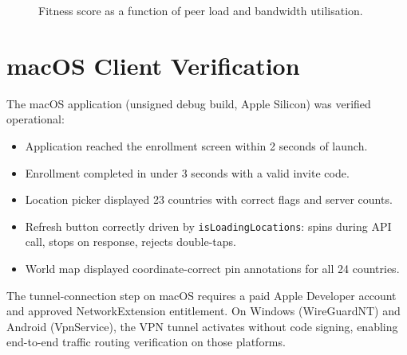 \documentclass[12pt,a4paper]{report}
\begin{document}
\begin{figure}[H]
\centering
{}
\caption{Fitness score as a function of peer load and bandwidth utilisation.}
\label{fig:fitness}
\end{figure}

\section{macOS Client Verification}

The macOS application (unsigned debug build, Apple Silicon) was verified operational:
\begin{itemize}[leftmargin=*, topsep=2pt, itemsep=0pt]
  \item Application reached the enrollment screen within 2 seconds of launch.
  \item Enrollment completed in under 3 seconds with a valid invite code.
  \item Location picker displayed 23 countries with correct flags and server counts.
  \item Refresh button correctly driven by \texttt{isLoadingLocations}: spins during API call, stops on response, rejects double-taps.
  \item World map displayed coordinate-correct pin annotations for all 24 countries.
\end{itemize}

The tunnel-connection step on macOS requires a paid Apple Developer account and approved NetworkExtension entitlement. On Windows (WireGuardNT) and Android (VpnService), the VPN tunnel activates without code signing, enabling end-to-end traffic routing verification on those platforms.
\end{document}
